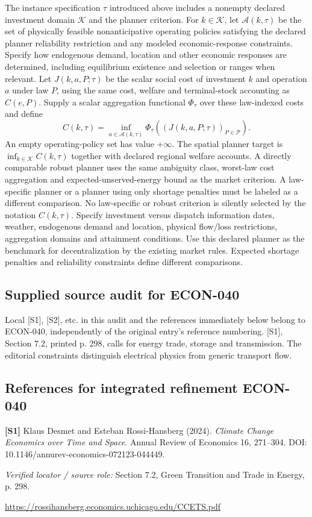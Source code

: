 \documentclass[11pt,a4paper]{article}
\begin{document}
The instance specification $\tau$ introduced above includes a nonempty declared investment domain $\mathcal K$ and the planner criterion. For $k\in\mathcal K$, let $\mathcal A(k,\tau)$ be the set of physically feasible nonanticipative operating policies satisfying the declared planner reliability restriction and any modeled economic-response constraints. Specify how endogenous demand, location and other economic responses are determined, including equilibrium existence and selection or ranges when relevant. Let $J(k,a,P;\tau)$ be the scalar social cost of investment $k$ and operation $a$ under law $P$, using the same cost, welfare and terminal-stock accounting as $C(e,P)$. Supply a scalar aggregation functional $\Phi_\tau$ over these law-indexed costs and define
\[
 C(k,\tau)=\inf_{a\in\mathcal A(k,\tau)}
 \Phi_\tau\!\left((J(k,a,P;\tau))_{P\in\mathcal P}\right).
\]
An empty operating-policy set has value $+\infty$. The spatial planner target is $\inf_{k\in\mathcal K}C(k,\tau)$ together with declared regional welfare accounts. A directly comparable robust planner uses the same ambiguity class, worst-law cost aggregation and expected-unserved-energy bound as the market criterion. A law-specific planner or a planner using only shortage penalties must be labeled as a different comparison. No law-specific or robust criterion is silently selected by the notation $C(k,\tau)$. Specify investment versus dispatch information dates, weather, endogenous demand and location, physical flow/loss restrictions, aggregation domains and attainment conditions. Use this declared planner as the benchmark for decentralization by the existing market rules. Expected shortage penalties and reliability constraints define different comparisons.
\subsection*{Supplied source audit for ECON-040}
Local [S1], [S2], etc. in this audit and the references immediately below
belong to ECON-040, independently of the original entry's reference numbering.
[S1], Section 7.2, printed p. 298, calls for energy trade, storage and transmission. The editorial constraints distinguish electrical physics from generic transport flow.
\subsection*{References for integrated refinement ECON-040}
{\footnotesize\raggedright
\par\noindent\textbf{[S1]} Klaus Desmet and Esteban Rossi-Hansberg (2024). \emph{Climate Change Economics over Time and Space}. Annual Review of Economics 16, 271–304. DOI: 10.1146/annurev-economics-072123-044449.\par \textit{Verified locator / source role:} Section 7.2, Green Transition and Trade in Energy, p. 298.\par \url{https://rossihansberg.economics.uchicago.edu/CCETS.pdf}\par\smallskip
}
\end{document}
